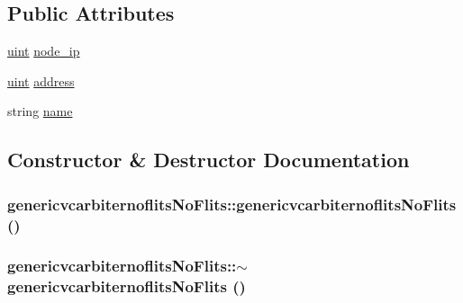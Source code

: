 \subsection*{Public Attributes}
\begin{CompactItemize}
\item 
\hyperlink{outputBuffer_8h_91ad9478d81a7aaf2593e8d9c3d06a14}{uint} \hyperlink{classgenericvcarbiternoflitsNoFlits_17c531b8bb9df1098347bdfdf50f8bc9}{node\_\-ip}
\item 
\hyperlink{outputBuffer_8h_91ad9478d81a7aaf2593e8d9c3d06a14}{uint} \hyperlink{classgenericvcarbiternoflitsNoFlits_5160d84b65185cfc3d7942ebb186982c}{address}
\item 
string \hyperlink{classgenericvcarbiternoflitsNoFlits_9f7e29c9d9d8568b3178082ed6c76f4e}{name}
\end{CompactItemize}


\subsection{Constructor \& Destructor Documentation}
\hypertarget{classgenericvcarbiternoflitsNoFlits_db66d29bba61a5e4bf3ef5ec5d61ce15}{
\subsubsection[{genericvcarbiternoflitsNoFlits}]{\setlength{\rightskip}{0pt plus 5cm}genericvcarbiternoflitsNoFlits::genericvcarbiternoflitsNoFlits ()}}
\label{classgenericvcarbiternoflitsNoFlits_db66d29bba61a5e4bf3ef5ec5d61ce15}


\hypertarget{classgenericvcarbiternoflitsNoFlits_337ead5b3dee13995af1c6636f7f3670}{
\subsubsection[{$\sim$genericvcarbiternoflitsNoFlits}]{\setlength{\rightskip}{0pt plus 5cm}genericvcarbiternoflitsNoFlits::$\sim$genericvcarbiternoflitsNoFlits ()}}
\label{classgenericvcarbiternoflitsNoFlits_337ead5b3dee13995af1c6636f7f3670}




